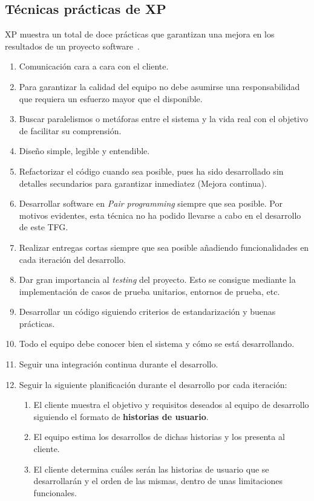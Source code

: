 \subsection{Técnicas prácticas de XP}
\gls{XP} muestra un total de doce prácticas que garantizan una mejora en los resultados de un proyecto software~\cite{BaEu11}.
\begin{enumerate}
\item Comunicación cara a cara con el cliente.
\item Para garantizar la calidad del equipo no debe asumirse una responsabilidad que requiera un esfuerzo mayor que el disponible.
\item Buscar paralelismos o metáforas entre el sistema y la vida real con el objetivo de facilitar su comprensión.
\item Diseño simple, legible y entendible.
\item Refactorizar el código cuando sea posible, pues ha sido desarrollado sin detalles secundarios para garantizar inmediatez (Mejora continua).
\item Desarrollar software en \textit{Pair programming} siempre que sea posible. Por motivos evidentes, esta técnica no ha podido llevarse a cabo en el desarrollo de este \gls{TFG}.
\item Realizar entregas cortas siempre que sea posible añadiendo funcionalidades en cada iteración del desarrollo.
\item Dar gran importancia al \textit{testing} del proyecto. Esto se consigue mediante la implementación de casos de prueba unitarios, entornos de prueba, etc.
\item Desarrollar un código siguiendo criterios de estandarización y buenas prácticas.
\item Todo el equipo debe conocer bien el sistema y cómo se está desarrollando.
\item Seguir una integración continua durante el desarrollo.
\item Seguir la siguiente planificación durante el desarrollo por cada iteración:
  \begin{enumerate}
  \item El cliente muestra el objetivo y requisitos deseados al equipo de desarrollo siguiendo el formato de \textbf{historias de usuario}.
  \item El equipo estima los desarrollos de dichas historias y los presenta al cliente.
  \item El cliente determina cuáles serán las historias de usuario que se desarrollarán y el orden de las mismas, dentro de unas limitaciones funcionales.
    \end{enumerate}
\end{enumerate}
